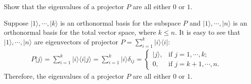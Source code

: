 \documentclass[en]{sol-man}
\begin{document}
\begin{exe}
    Show that the eigenvalues of a projector $P$ are all either $0$ or $1$.
\end{exe}
\begin{pf}
    Suppose $\lvert 1\rangle,\cdots,\lvert k\rangle$ is an orthonormal basis for the subspace $P$ and $\lvert 1\rangle,\cdots,\lvert n\rangle$ is an orthonormal basis for the total vector space, where $k\leq n$. It is easy to see that $\lvert 1\rangle,\cdots,\lvert n\rangle$ are eigenvectors of projector $P=\sum_{i=1}^k\lvert i\rangle\langle i\rvert$:
    \begin{align}
        P\lvert j\rangle=\sum_{i=1}^k\lvert i\rangle\langle i\vert j\rangle=\sum_{i=1}^k\lvert i\rangle\delta_{ij}=\left\{\begin{array}{ll}
            \lvert j\rangle,&\text{if }j=1,\cdots,k;\\
            0,&\text{if }j=k+1,\cdots,n.
        \end{array}\right.
    \end{align}
    Therefore, the eigenvalues of a projector $P$ are all either $0$ or $1$.
\end{pf}
\end{document}
